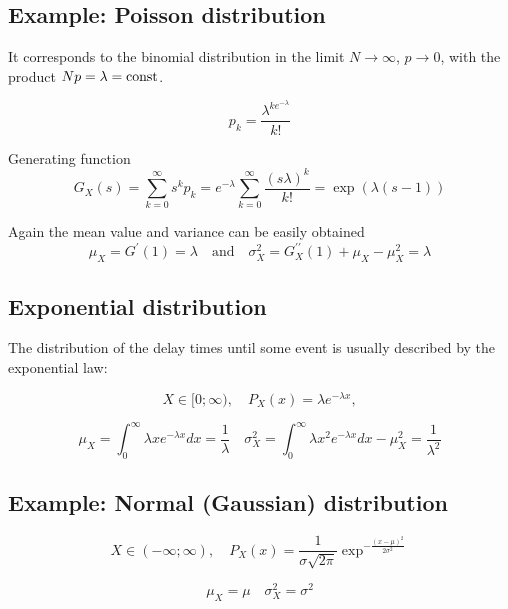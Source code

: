 \subsection*{Example: Poisson distribution}
It corresponds to the binomial distribution in the limit $N \rightarrow \infty$, $p \rightarrow 0$, with the product $N p = \lambda = {\rm const}$.

\begin{equation*}
    p_k = \frac{\lambda^{k e^{-\lambda}}}{k!}
\end{equation*}

Generating function
\begin{equation*}
    G_X(s) = \sum^{\infty}_{k=0} s^k p_k = e^{- \lambda} \sum^{\infty}_{k=0} \frac{(s \lambda)^k}{k!} = \exp(\lambda(s-1))
\end{equation*}

Again the mean value and variance can be easily obtained
\begin{equation*}
    \mu_X = G^{\prime}(1) = \lambda \quad \text{and} \quad \sigma_X^2 = G^{\prime \prime}_X(1) + \mu_X - \mu_X^2 = \lambda
\end{equation*}

\subsection*{Exponential distribution}
The distribution of the delay times until some event is usually described by the exponential law:

\begin{equation*}
    X \in [0; \infty), \quad P_X(x) = \lambda e^{- \lambda x},
\end{equation*}

\begin{equation*}
    \mu_X = \int_{0}^{\infty} \lambda x e^{- \lambda x} dx = \frac{1}{\lambda} \quad \sigma_X^2 = \int_{0}^{\infty} \lambda x^2 e^{- \lambda x} dx - \mu^2_X = \frac{1}{\lambda^2}
\end{equation*}


\subsection*{Example: Normal (Gaussian) distribution}
\begin{equation*}
    X \in (-\infty; \infty), \quad P_X(x) = \frac{1}{\sigma \sqrt{2 \pi}} \exp^{-\frac{(x-\mu)^2}{2 \sigma^2}}
\end{equation*}

\begin{equation*}
    \mu_X = \mu \quad \sigma_X^2 = \sigma^2
\end{equation*}


